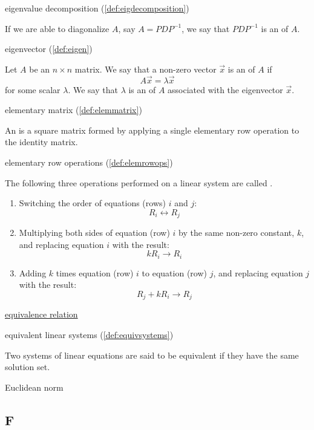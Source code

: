 \documentclass{ximera}
\begin{document}
eigenvalue decomposition (\ref{def:eigdecomposition})
\begin{expandable}
    If we are able to diagonalize $A$, say $A=PDP^{-1}$, we say that $PDP^{-1}$ is an  of $A$.
\end{expandable}

eigenvector (\ref{def:eigen})
\begin{expandable}
    Let $A$ be an $n \times n$ matrix.  We say that a non-zero vector $\vec{x}$ is an  of $A$ if $$A\vec{x} = \lambda \vec{x}$$
for some scalar $\lambda$.
We say that $\lambda$ is an  of $A$ associated with the eigenvector $\vec{x}$.
\end{expandable}

elementary matrix (\ref{def:elemmatrix})
\begin{expandable}
    An  is a square matrix formed by applying a single elementary row operation to the identity matrix.
\end{expandable}

elementary row operations (\ref{def:elemrowops})
\begin{expandable}
    The following three operations performed on a linear system are called .
\begin{enumerate}
\item Switching the order of equations (rows) $i$ and $j$:
$$R_i\leftrightarrow R_j$$
\item Multiplying both sides of equation (row) $i$ by the same non-zero constant, $k$, and replacing equation $i$ with the result:
$$kR_i\rightarrow R_i$$
\item Adding $k$ times equation (row) $i$ to equation (row) $j$, and replacing equation $j$ with the result:
$$R_j+kR_i\rightarrow R_j$$
\end{enumerate}
\end{expandable}

\href{https://ximera.osu.edu/oerlinalg/LinearAlgebra/EIG-0040/main}{equivalence relation}

equivalent linear systems (\ref{def:equivsystems})
\begin{expandable}
    Two systems of linear equations are said to be equivalent if they have the same solution set.
\end{expandable}

Euclidean norm


\subsection{F}
\end{document}
